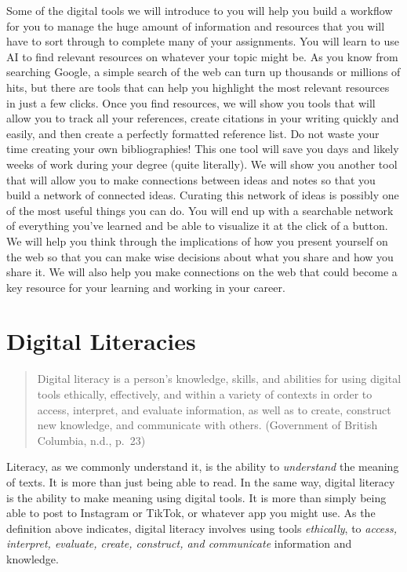 \documentclass[
  letterpaper,
  DIV=11,
  numbers=noendperiod]{scrreprt}
\begin{document}
Some of the digital tools we will introduce to you will help you build a
workflow for you to manage the huge amount of information and resources
that you will have to sort through to complete many of your assignments.
You will learn to use AI to find relevant resources on whatever your
topic might be. As you know from searching Google, a simple search of
the web can turn up thousands or millions of hits, but there are tools
that can help you highlight the most relevant resources in just a few
clicks. Once you find resources, we will show you tools that will allow
you to track all your references, create citations in your writing
quickly and easily, and then create a perfectly formatted reference
list. Do not waste your time creating your own bibliographies! This one
tool will save you days and likely weeks of work during your degree
(quite literally). We will show you another tool that will allow you to
make connections between ideas and notes so that you build a network of
connected ideas. Curating this network of ideas is possibly one of the
most useful things you can do. You will end up with a searchable network
of everything you've learned and be able to visualize it at the click of
a button. We will help you think through the implications of how you
present yourself on the web so that you can make wise decisions about
what you share and how you share it. We will also help you make
connections on the web that could become a key resource for your
learning and working in your career.

\section{Digital Literacies}\label{digital-literacies}

\begin{quote}
Digital literacy is a person's knowledge, skills, and abilities for
using digital tools ethically, effectively, and within a variety of
contexts in order to access, interpret, and evaluate information, as
well as to create, construct new knowledge, and communicate with others.
(Government of British Columbia, n.d., p.~23)
\end{quote}

Literacy, as we commonly understand it, is the ability to
\emph{understand} the meaning of texts. It is more than just being able
to read. In the same way, digital literacy is the ability to make
meaning using digital tools. It is more than simply being able to post
to Instagram or TikTok, or whatever app you might use. As the definition
above indicates, digital literacy involves using tools \emph{ethically},
to \emph{access, interpret, evaluate, create, construct, and
communicate} information and knowledge.
\end{document}
